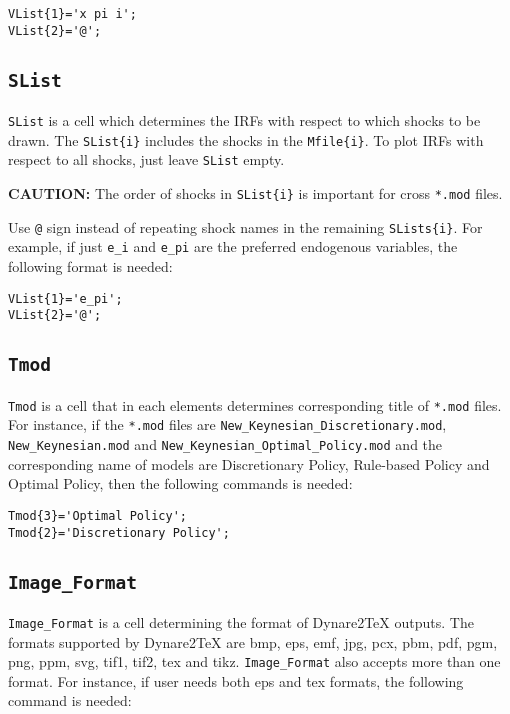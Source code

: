 \documentclass[11pt,a4paper]{article}
\begin{document}
\begin{lstlisting} 
VList{1}='x pi i'; 
VList{2}='@';
\end{lstlisting}

\subsection{\texttt{SList}}
\texttt{SList} is a cell which determines the IRFs with respect to which shocks to be drawn. The \texttt{SList\{i\}} includes the shocks in the \texttt{Mfile\{i\}}.  To plot IRFs with respect to all shocks, just leave \texttt{SList} empty.

{\bf CAUTION:} The order of shocks in \texttt{SList\{i\}} is important for cross \texttt{*.mod} files.

Use \texttt{@} sign instead of repeating shock names in the remaining \texttt{SLists\{i\}}. For example, if just \texttt{e\_i} and \texttt{e\_pi} are the preferred 
endogenous variables, the following format is needed:

\begin{lstlisting} 
VList{1}='e_pi'; 
VList{2}='@';
\end{lstlisting}


\subsection{\texttt{Tmod}}
\texttt{Tmod} is a cell that in each elements determines corresponding title of \texttt{*.mod} files. For instance, if the \texttt{*.mod} files are \texttt{New_Keynesian_Discretionary.mod}, \texttt{New_Keynesian.mod} and \texttt{New_Keynesian_Optimal_Policy.mod} and the corresponding name of models are Discretionary Policy, Rule-based Policy and Optimal Policy, then the following commands is needed:
    
\begin{lstlisting} 
Tmod{3}='Optimal Policy';
Tmod{2}='Discretionary Policy'; 
\end{lstlisting}

\subsection{\texttt{Image_Format}}
\texttt{Image_Format} is a cell determining the format of Dynare2TeX outputs.
The formats supported by Dynare2TeX are bmp, eps, emf, jpg, pcx, pbm, pdf, pgm, png, ppm, svg, tif1, tif2, tex and tikz. \texttt{Image_Format} also accepts more than one format. For instance, if user needs both eps and tex formats, the following command is needed:
\end{document}
